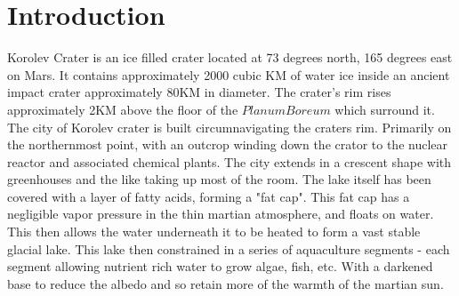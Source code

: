 \documentclass[10pt]{article}
\begin{document}
\section*{Introduction}
Korolev Crater is an ice filled crater located at 73 degrees north, 165 degrees east on Mars. It contains approximately 2000 cubic KM of water ice inside an ancient impact crater approximately 80KM in diameter. The crater's rim rises approximately 2KM above the floor of the $Planum Boreum$ which surround it.  The city of Korolev crater is built circumnavigating the craters rim. Primarily on the northernmost point, with an outcrop winding down the crator to the nuclear reactor and associated chemical plants. The city extends in a crescent shape with greenhouses and the like taking up most of the room. The lake itself has been covered with a layer of fatty acids, forming a "fat cap". This fat cap has a negligible vapor pressure in the thin martian atmosphere, and floats on water. This then allows the water underneath it to be heated to form a vast stable glacial lake. This lake then constrained in a series of aquaculture segments - each segment allowing nutrient rich water to grow algae, fish, etc. With a darkened base to reduce the albedo and so retain more of the warmth of the martian sun.
\end{document}
